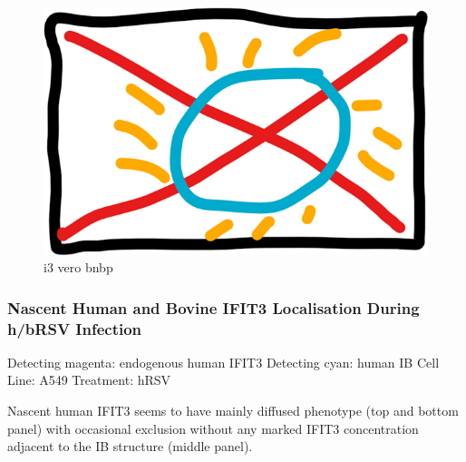 \begin{figure}
    \centering
    \includegraphics[width=1\linewidth]{06. Chapter 1//Figs/00. placeholder.png}
    \caption[i3 vero bnbp]{i3 vero bnbp}
    \label{i3 vero bnbp}
\end{figure}

\subsubsection{Nascent Human and Bovine IFIT3 Localisation During h/bRSV Infection} \label{Nascent Human and Bovine IFIT3 Localisation During h/bRSV Infection}
 \label{hIFIT3 Localisation During hRSV Infection}
Detecting magenta: endogenous human IFIT3 \newline
Detecting cyan: human IB \newline
Cell Line: A549 \newline
Treatment: hRSV \newline

Nascent human IFIT3 seems to have mainly diffused phenotype (top and bottom panel) with occasional exclusion without any marked IFIT3 concentration adjacent to the IB structure (middle panel).

